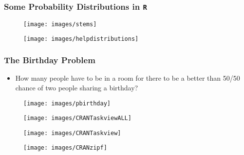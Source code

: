 \documentclass[MAIN.tex]{subfiles}
\begin{document}
\begin{frame}
\frametitle{Some Probability Distributions in \texttt{R}}
	\begin{figure}
\centering
\texttt{[image: images/stems]}
\end{figure}
\end{frame}

\begin{frame}
\begin{figure}
\centering
\texttt{[image: images/helpdistributions]}
\end{figure}
\end{frame}
\begin{frame}
	\frametitle{The Birthday Problem}
\begin{itemize}
\item How many people have to be in a room for there to be a better than 50/50 chance of two people sharing a birthday?
\end{itemize}	
	\begin{figure}
\centering
\texttt{[image: images/pbirthday]}
\end{figure}

\end{frame}
\begin{frame}
	\begin{figure}
		\centering
		\texttt{[image: images/CRANTaskviewALL]}
		
	\end{figure}
\end{frame}
\begin{frame}
	\begin{figure}
\centering
\texttt{[image: images/CRANTaskview]}

\end{figure}
\end{frame}
\begin{frame}

	\begin{figure}
\centering
\texttt{[image: images/CRANzipf]}

\end{figure}

\end{frame}
\end{document}
